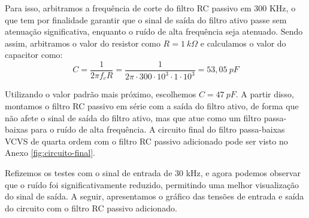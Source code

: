 Para isso, arbitramos a frequência de corte do filtro RC passivo em 300 KHz, o que tem por finalidade garantir que o sinal de saída do filtro ativo passe sem atenuação significativa, enquanto o ruído de alta frequência seja atenuado. Sendo assim, arbitramos o valor do resistor como $R = 1~k\Omega$ e calculamos o valor do capacitor como:
\begin{equation}
    C = \frac{1}{2 \pi f_c R} = \frac{1}{2 \pi \cdot 300 \cdot 10^3 \cdot 1 \cdot 10^3} = 53,05~pF
\end{equation}

Utilizando o valor padrão mais próximo, escolhemos $C = 47~pF$. A partir disso, montamos o filtro RC passivo em série com a saída do filtro ativo, de forma que não afete o sinal de saída do filtro ativo, mas que atue como um filtro passa-baixas para o ruído de alta frequência. A circuito final do filtro passa-baixas VCVS de quarta ordem com o filtro RC passivo adicionado pode ser visto no Anexo \ref{fig:circuito-final}.

Refizemos os testes com o sinal de entrada de 30 kHz, e agora podemos observar que o ruído foi significativamente reduzido, permitindo uma melhor visualização do sinal de saída. A seguir, apresentamos o gráfico das tensões de entrada e saída do circuito com o filtro RC passivo adicionado.






